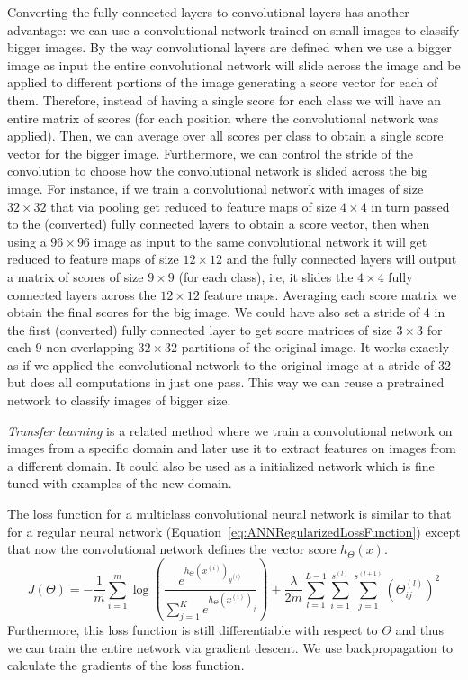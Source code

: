 Converting the fully connected layers to convolutional layers has another advantage: we can use a convolutional network trained on small images to classify bigger images. By the way convolutional layers are defined when we use a bigger image as input the entire convolutional network will slide across the image and be applied to different portions of the image generating a score vector for each of them. Therefore, instead of having a single score for each class we will have an entire matrix of scores (for each position where the convolutional network was applied). Then, we can average over all scores per class to obtain a single score vector for the bigger image. Furthermore, we can control the stride of the convolution to choose how the convolutional network is slided across the big image.
For instance, if we train a convolutional network with images of size $32\times 32$ that via pooling get reduced to feature maps of size $4\times 4$ in turn passed to the (converted) fully connected layers to obtain a score vector, then when using a $96\times 96$ image as input to the same convolutional network it will get reduced to feature maps of size $12 \times 12$ and the fully connected layers will output a matrix of scores of size $9\times 9$ (for each class), i.e, it slides the $4\times 4$ fully connected layers across the $12\times 12$ feature maps. Averaging each score matrix we obtain the final scores for the big image. We could have also  set a stride of 4 in the first (converted) fully connected layer to get score matrices of size $3\times 3$ for each 9 non-overlapping $32\times 32$ partitions of the original image. It works exactly as if we applied the convolutional network to the original image at a stride of 32 but does all computations in just one pass. This way we can reuse a pretrained network to classify images of bigger size. 

\emph{Transfer learning} is a related method where we train a convolutional network on images from a specific domain and later use it to extract features on images from a different domain. It could also be used as a initialized network which is fine tuned with examples of the new domain.

The loss function for a multiclass convolutional neural network is similar to that for a regular neural network (Equation~\ref{eq:ANNRegularizedLossFunction}) except that now the convolutional network defines the vector score $h_\Theta(x)$.
\begin{equation}
	J(\Theta) = -\frac{1}{m} \sum_{i=1}^m \log \left ( \frac{ e^{h_\Theta(x^{(i)})_{y^{(i)}}} }{ \sum_{j=1}^K e^{ h_\Theta (x^{(i)})_j} } \right ) + \frac{\lambda}{2m}\sum_{l=1}^{L-1}\sum_{i=1}^{s^{(l)}}\sum_{j=1}^{s^{(l+1)}} \left(\Theta^{(l)}_{ij}\right)^2
	\label{eq:ConvNetLossFunction}
\end{equation}
Furthermore, this loss function is still differentiable with respect to $\Theta$ and thus we can train the entire network via gradient descent. We use backpropagation to calculate the gradients of the loss function.
